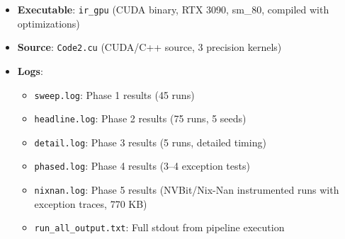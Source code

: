 \documentclass[11pt,a4paper]{article}
\begin{document}
\begin{itemize}
  \item \textbf{Executable}: \texttt{ir\_gpu} (CUDA binary, RTX 3090, sm\_80, compiled with optimizations)
  \item \textbf{Source}: \texttt{Code2.cu} (CUDA/C++ source, 3 precision kernels)
  \item \textbf{Logs}:
  \begin{itemize}
    \item \texttt{sweep.log}: Phase 1 results (45 runs)
    \item \texttt{headline.log}: Phase 2 results (75 runs, 5 seeds)
    \item \texttt{detail.log}: Phase 3 results (5 runs, detailed timing)
    \item \texttt{phased.log}: Phase 4 results (3--4 exception tests)
    \item \texttt{nixnan.log}: Phase 5 results (NVBit/Nix-Nan instrumented runs with exception traces, 770 KB)
    \item \texttt{run\_all\_output.txt}: Full stdout from pipeline execution
  \end{itemize}
\end{itemize}
\end{document}
